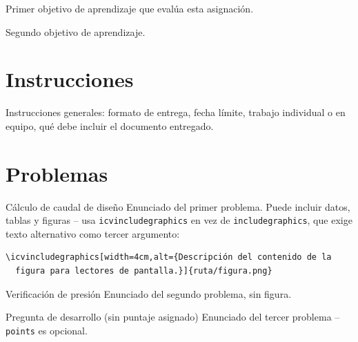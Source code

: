 \documentclass[11pt]{scrartcl}
\begin{document}
\icvmaketitle

\begin{icvobjectives}
  \item Primer objetivo de aprendizaje que evalúa esta asignación.
  \item Segundo objetivo de aprendizaje.
\end{icvobjectives}

\section{Instrucciones}

Instrucciones generales: formato de entrega, fecha límite, trabajo
individual o en equipo, qué debe incluir el documento entregado.

\section{Problemas}

\begin{icvproblem}[points=15]{Cálculo de caudal de diseño}
Enunciado del primer problema. Puede incluir datos, tablas y figuras --
usa \texttt{icvincludegraphics} en vez de \texttt{includegraphics}, que
exige texto alternativo como tercer argumento:
\begin{verbatim}
\icvincludegraphics[width=4cm,alt={Descripción del contenido de la
  figura para lectores de pantalla.}]{ruta/figura.png}
\end{verbatim}
\end{icvproblem}

\begin{icvproblem}[points=10]{Verificación de presión}
Enunciado del segundo problema, sin figura.
\end{icvproblem}

\begin{icvproblem}{Pregunta de desarrollo (sin puntaje asignado)}
Enunciado del tercer problema -- \texttt{points} es opcional.
\end{icvproblem}
\end{document}
